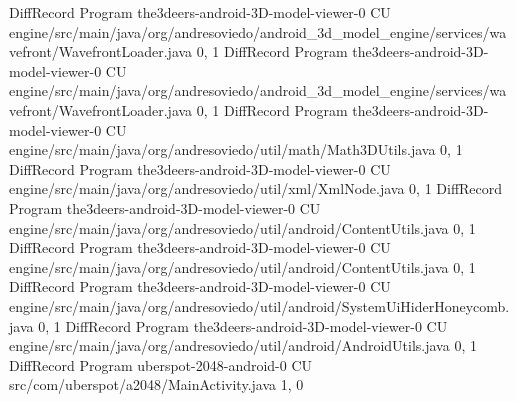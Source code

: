 DiffRecord Program the3deers-android-3D-model-viewer-0 CU engine/src/main/java/org/andresoviedo/android_3d_model_engine/services/wavefront/WavefrontLoader.java  {0, 1}
DiffRecord Program the3deers-android-3D-model-viewer-0 CU engine/src/main/java/org/andresoviedo/android_3d_model_engine/services/wavefront/WavefrontLoader.java  {0, 1}
DiffRecord Program the3deers-android-3D-model-viewer-0 CU engine/src/main/java/org/andresoviedo/util/math/Math3DUtils.java  {0, 1}
DiffRecord Program the3deers-android-3D-model-viewer-0 CU engine/src/main/java/org/andresoviedo/util/xml/XmlNode.java  {0, 1}
DiffRecord Program the3deers-android-3D-model-viewer-0 CU engine/src/main/java/org/andresoviedo/util/android/ContentUtils.java  {0, 1}
DiffRecord Program the3deers-android-3D-model-viewer-0 CU engine/src/main/java/org/andresoviedo/util/android/ContentUtils.java  {0, 1}
DiffRecord Program the3deers-android-3D-model-viewer-0 CU engine/src/main/java/org/andresoviedo/util/android/SystemUiHiderHoneycomb.java  {0, 1}
DiffRecord Program the3deers-android-3D-model-viewer-0 CU engine/src/main/java/org/andresoviedo/util/android/AndroidUtils.java  {0, 1}
DiffRecord Program uberspot-2048-android-0 CU src/com/uberspot/a2048/MainActivity.java  {1, 0}
